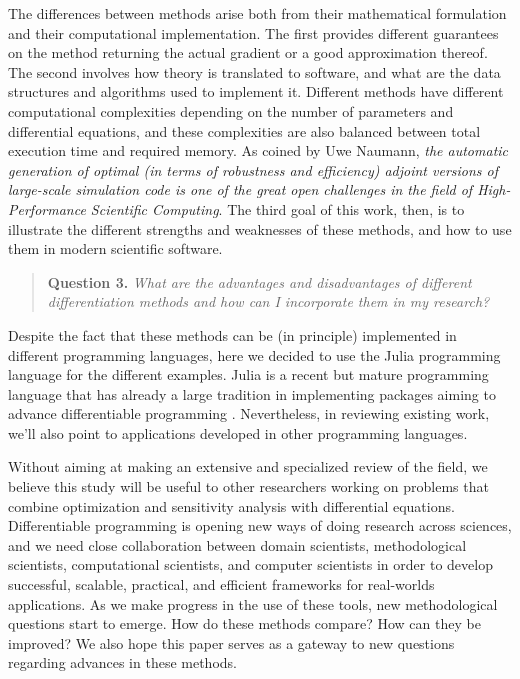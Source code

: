 The differences between methods arise both from their mathematical formulation and their computational implementation. 
The first provides different guarantees on the method returning the actual gradient or a good approximation thereof. 
The second involves how theory is translated to software, and what are the data structures and algorithms used to implement it. 
Different methods have different computational complexities depending on the number of parameters and differential equations, and these complexities are also balanced between total execution time and required memory. 
As coined by Uwe Naumann, \textit{the automatic generation of optimal (in terms of robustness and efficiency) adjoint versions of large-scale simulation code is one of the great open challenges in the field of High-Performance Scientific Computing}\cite{Naumann.2011}.
The third goal of this work, then, is to illustrate the different strengths and weaknesses of these methods, and how to use them in modern scientific software. 
\begin{quote}
    \textbf{Question 3. }
    \textit{What are the advantages and disadvantages of different differentiation methods and how can I incorporate them in my research?}
\end{quote}
Despite the fact that these methods can be (in principle) implemented in different programming languages, here we decided to use the Julia programming language for the different examples. 
Julia is a recent but mature programming language that has already a large tradition in implementing packages aiming to advance differentiable programming \cite{Bezanson_Karpinski_Shah_Edelman_2012, Julialang_2017}.
Nevertheless, in reviewing existing work, we'll also point to applications developed in other programming languages.

Without aiming at making an extensive and specialized review of the field, we believe this study will be useful to other researchers working on problems that combine optimization and sensitivity analysis with differential equations.
Differentiable programming is opening new ways of doing research across sciences, and we need close collaboration between domain scientists, methodological scientists, computational scientists, and computer scientists in order to develop successful, scalable, practical, and efficient frameworks for real-worlds applications.
As we make progress in the use of these tools, new methodological questions start to emerge. 
How do these methods compare? How can they be improved? 
We also hope this paper serves as a gateway to new questions regarding advances in these methods. 


